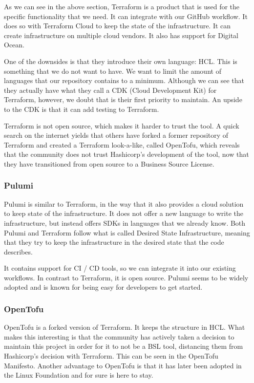 As we can see in the above section, Terraform is a product that is used for the specific functionality that we need. It can integrate with our GitHub workflow. It does so with Terraform Cloud to keep the state of the infrastructure. It can create infrastructure on multiple cloud vendors. It also has support for Digital Ocean.

One of the downsides is that they introduce their own language: HCL. This is something that we do not want to have. We want to limit the amount of languages that our repository contains to a minimum. Although we can see that they actually have what they call a CDK (Cloud Development Kit) for Terraform, however, we doubt that is their first priority to maintain. An upside to the CDK is that it can add testing to Terraform.

Terraform is not open source, which makes it harder to trust the tool. A quick search on the internet yields that others have forked a former repository of Terraform and created a Terraform look-a-like, called OpenTofu, which reveals that the community does not trust Hashicorp's development of the tool, now that they have transitioned from open source to a Business Source License.

\subsubsection{Pulumi}

Pulumi is similar to Terraform, in the way that it also provides a cloud solution to keep state of the infrastructure. It does not offer a new language to write the infrastructure, but instead offers SDKs in languages that we already know. Both Pulumi and Terraform follow what is called Desired State Infrastructure, meaning that they try to keep the infrastructure in the desired state that the code describes.

It contains support for CI / CD tools, so we can integrate it into our existing workflows. In contrast to Terraform, it is open source. Pulumi seems to be widely adopted and is known for being easy for developers to get started.

\subsubsection{OpenTofu}

OpenTofu is a forked version of Terraform. It keeps the structure in HCL. What makes this interesting is that the community has actively taken a decision to maintain this project in order for it to not be a BSL tool, distancing them from Hashicorp's decision with Terraform. This can be seen in the OpenTofu Manifesto\cite{opentofu_manifesto}. Another advantage to OpenTofu is that it has later been adopted in the Linux Foundation and for sure is here to stay.


